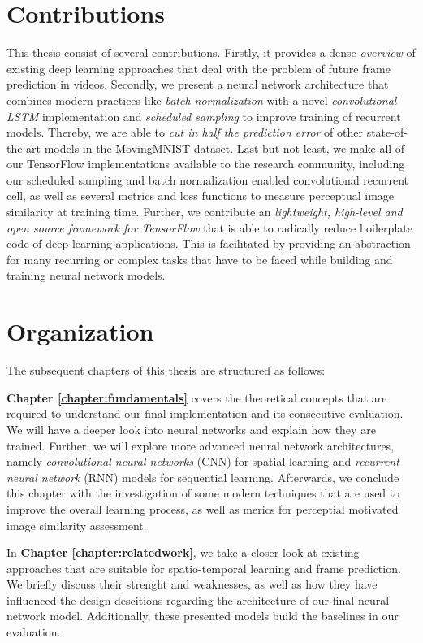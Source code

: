 \section{Contributions}

This thesis consist of several contributions. Firstly, it provides a dense \textit{overview} of existing deep learning approaches that deal with the problem of future frame prediction in videos. Secondly, we present a neural network architecture that combines modern practices like \textit{batch normalization} with a novel \textit{convolutional LSTM} implementation and \textit{scheduled sampling} to improve training of recurrent models. Thereby, we are able to \textit{cut in half the prediction error} of other state-of-the-art models in the MovingMNIST dataset. Last but not least, we make all of our TensorFlow implementations available to the research community, including our scheduled sampling and batch normalization enabled convolutional recurrent cell, as well as several metrics and loss functions to measure perceptual image similarity at training time. Further, we contribute an \textit{lightweight, high-level and open source framework for TensorFlow} that is able to radically reduce boilerplate code of deep learning applications. This is facilitated by providing an abstraction for many recurring or complex tasks that have to be faced while building and training neural network models.


\section{Organization}

The subsequent chapters of this thesis are structured as follows:

\textbf{Chapter \ref{chapter:fundamentals}} covers the theoretical concepts that are required to understand our final implementation and its consecutive evaluation. We will have a deeper look into neural networks and explain how they are trained. Further, we will explore more advanced neural network architectures, namely \textit{convolutional neural networks} (CNN) for spatial learning and \textit{recurrent neural network} (RNN) models for sequential learning. Afterwards, we conclude this chapter with the investigation of some modern techniques that are used to improve the overall learning process, as well as merics for perceptial motivated image similarity assessment.

In \textbf{Chapter \ref{chapter:relatedwork}}, we take a closer look at existing approaches that are suitable for spatio-temporal learning and frame prediction. We briefly discuss their strenght and weaknesses, as well as how they have influenced the design descitions regarding the architecture of our final neural network model. Additionally, these presented models build the baselines in our evaluation.

